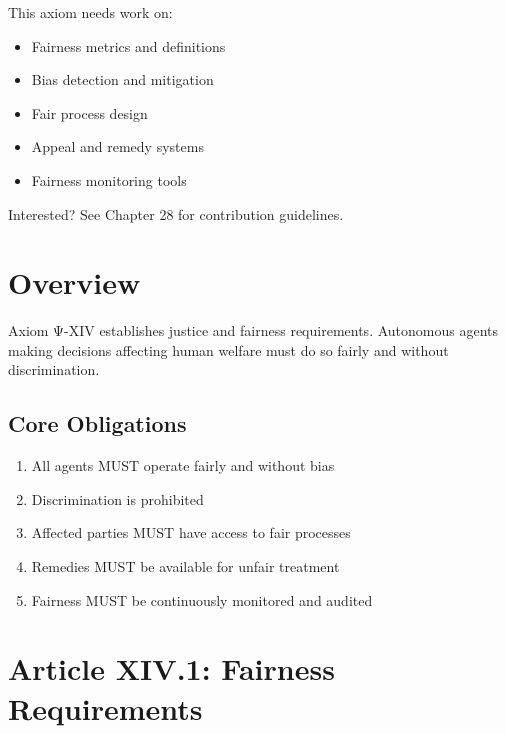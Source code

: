 \begin{tcolorbox}[colback=lightgray, colframe=accentgold, title=\textbf{🎯 Contribution Opportunity}]
This axiom needs work on:
\begin{itemize}
    \item Fairness metrics and definitions
    \item Bias detection and mitigation
    \item Fair process design
    \item Appeal and remedy systems
    \item Fairness monitoring tools
\end{itemize}

Interested? See Chapter 28 for contribution guidelines.
\end{tcolorbox}

\vspace{0.5cm}

\section{Overview}

Axiom Ψ-XIV establishes justice and fairness requirements. Autonomous agents making decisions affecting human welfare must do so fairly and without discrimination.

\subsection{Core Obligations}

\begin{enumerate}
    \item All agents MUST operate fairly and without bias
    \item Discrimination is prohibited
    \item Affected parties MUST have access to fair processes
    \item Remedies MUST be available for unfair treatment
    \item Fairness MUST be continuously monitored and audited
\end{enumerate}

\vspace{0.5cm}

\section{Article XIV.1: Fairness Requirements}

